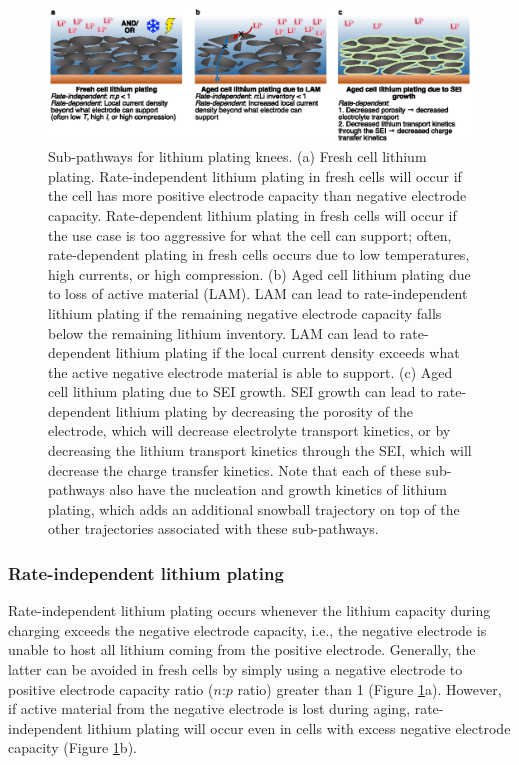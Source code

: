 \documentclass[journal=jpclcd,manuscript=article]{achemso}
\begin{document}
\begin{figure}[tbph]
    \centering
    \includegraphics[scale=0.9]{figures/plating_pathways.eps}
    \caption{Sub-pathways for lithium plating knees.
    (a) Fresh cell lithium plating. Rate-independent lithium plating in fresh cells will occur if the cell has more positive electrode capacity than negative electrode capacity.
    Rate-dependent lithium plating in fresh cells will occur if the use case is too aggressive for what the cell can support; often, rate-dependent plating in fresh cells occurs due to low temperatures, high currents, or high compression.
    (b) Aged cell lithium plating due to loss of active material (LAM). LAM can lead to rate-independent lithium plating if the remaining negative electrode capacity falls below the remaining lithium inventory. LAM can lead to rate-dependent lithium plating if the local current density exceeds what the active negative electrode material is able to support.
    (c) Aged cell lithium plating due to SEI growth. SEI growth can lead to rate-dependent lithium plating by decreasing the porosity of the electrode, which will decrease electrolyte transport kinetics, or by decreasing the lithium transport kinetics through the SEI, which will decrease the charge transfer kinetics.
    Note that each of these sub-pathways also have the nucleation and growth kinetics of lithium plating, which adds an additional snowball trajectory on top of the other trajectories associated with these sub-pathways.}
    \label{fig:plating_pathways}
\end{figure}

\subsubsection{Rate-independent lithium plating}


Rate-independent lithium plating occurs whenever the lithium capacity during charging exceeds the negative electrode capacity, i.e., the negative electrode is unable to host all lithium coming from the positive electrode. Generally, the latter can be avoided in fresh cells by simply using a negative electrode to positive electrode capacity ratio ($n$:$p$ ratio) greater than 1 (Figure \ref{fig:plating_pathways}a). However, if active material from the negative electrode is lost during aging, rate-independent lithium plating will occur even in cells with excess negative electrode capacity (Figure \ref{fig:plating_pathways}b).
\end{document}

